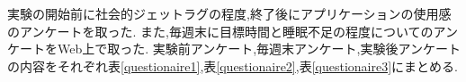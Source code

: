 実験の開始前に社会的ジェットラグの程度,終了後にアプリケーションの使用感のアンケートを取った.
また,毎週末に目標時間と睡眠不足の程度についてのアンケートをWeb上で取った.
実験前アンケート,毎週末アンケート,実験後アンケートの内容をそれぞれ表\ref{questionaire1},表\ref{questionaire2},表\ref{questionaire3}にまとめる.

\begin{table}[htbp]
	\begin{center}
 	\end{center}
 	\caption{実験前アンケートの内容}
 	\label{questionaire1}
\end{table}

\begin{table}[htbp]
	\begin{center}
 	\end{center}
 	\caption{毎週末アンケートの内容}
 	\label{questionaire2}
\end{table}

